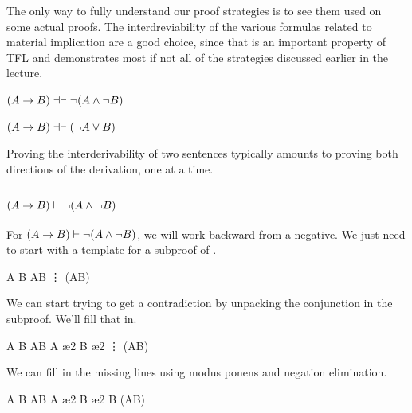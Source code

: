 The only way to fully understand our proof strategies is to see them used on
some actual proofs. The interdreviability of the various formulas related to
material implication are a good choice, since that is an important property of
TFL and demonstrates most if not all of the strategies discussed earlier in
the lecture.

\begin{argument}
\item[ ] $(A \rightarrow B)\dashv\vdash\neg(A \wedge\neg B)$
\item[ ] $(A \rightarrow B)\dashv\vdash(\neg A \vee B)$
\end{argument}

Proving the interderivability of two sentences typically amounts to proving both
directions of the derivation, one at a time.

\subsubsection{$(A \rightarrow B)\vdash \neg(A \wedge\neg B)$}

For $(A \rightarrow B)\vdash \neg(A \wedge\neg B)$, we will work backward from a
negative. We just need to start with a template for a subproof of \ebot.

\begin{fitchproof}
   {A \eif B}             
  \open
   {A\eand\enot B}        
   {\vdots}
   {\ebot}
  \close
   {\enot(A\eand\enot B)}    
\end{fitchproof}      

We can start trying to get a contradiction by unpacking the conjunction in the
subproof. We'll fill that in.

\begin{fitchproof}
   {A \eif B}             
  \open
   {A\eand\enot B}        
   {A}                    \ae{2}
   {\enot B}              \ae{2}
   {\vdots}
   {\ebot}
  \close
  \have[n] {} {\enot(A\eand\enot B)}    
\end{fitchproof}      

We can fill in the missing lines using modus ponens and negation elimination.

\begin{fitchproof}
   {A \eif B}             
  \open
   {A\eand\enot B}        
   {A}                    \ae{2}
   {\enot B}              \ae{2}
   {B}
   {\ebot}                
  \close
   {\enot(A\eand\enot B)}    
\end{fitchproof}      

